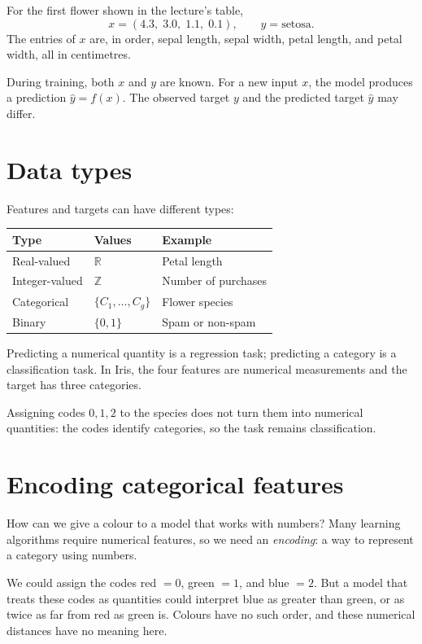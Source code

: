 \documentclass[a4paper,12pt,oneside]{report}
\begin{document}
For the first flower shown in the lecture's table,
\[
  x=(4.3,\;3.0,\;1.1,\;0.1),
  \qquad y=\text{setosa}.
\]
The entries of $x$ are, in order, sepal length, sepal width, petal length,
and petal width, all in centimetres.

During training, both $x$ and $y$ are known. For a new input $x$, the model
produces a prediction $\hat{y}=f(x)$. The observed target $y$ and the
predicted target $\hat{y}$ may differ.

\section{Data types}

Features and targets can have different types:
\begin{center}
\begin{tabularx}{\linewidth}{@{}llX@{}}
\toprule
\textbf{Type} & \textbf{Values} & \textbf{Example} \\
\midrule
Real-valued & $\mathbb{R}$ & Petal length \\
Integer-valued & $\mathbb{Z}$ & Number of purchases \\
Categorical & $\{C_1,\ldots,C_g\}$ & Flower species \\
Binary & $\{0,1\}$ & Spam or non-spam \\
\bottomrule
\end{tabularx}
\end{center}

Predicting a numerical quantity is a regression task; predicting a
category is a classification task. In Iris, the four features are
numerical measurements and the target has three categories.

Assigning codes $0,1,2$ to the species does not turn them into numerical
quantities: the codes identify categories, so the task remains
classification.

\clearpage
\section{Encoding categorical features}

How can we give a colour to a model that works with numbers? Many learning
algorithms require numerical features, so we need an \emph{encoding}: a
way to represent a category using numbers.

We could assign the codes red $=0$, green $=1$, and blue $=2$. But a model
that treats these codes as quantities could interpret blue as greater
than green, or as twice as far from red as green is. Colours have no
such order, and these numerical distances have no meaning here.
\end{document}
